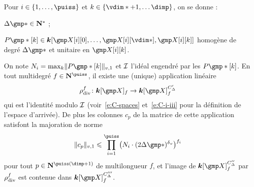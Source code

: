 \begin{lem}
  Pour \( \fct \in \{ 1, \dots, \puiss \} \) et \( \ind \in \{ \vdim* + 1,
  \dots \dimp \} \), on se donne :
  \begin{enumthm}
    \item \( \Delta\mexp* \in \N^* \) ;
    \item \( P\mexp*[\ind]
      \in
      \cdn [ \cmh\fct[0], \dots, \cmh\fct[\vdim*], \cmh\fct[\ind] ] \)
      homogène de degré \( \Delta\mexp* \) et unitaire en \( \cmh\fct[\ind]
      \).
  \end{enumthm}
  On note \( N_\fct = \max_\ind \nv1 { P\mexp*[\ind] } \) et \( \mathcal I \)
  l'idéal engendré par les \( P\mexp*[\ind] \). En tout multidegré
  \( f \in \N^\puiss \), il existe une (unique) application linéaire
  \begin{equation}
    \rdiv^f \colon \cdn [\cmmh]_ f \to \cdn [\cmmh]_ f^{C'_\Delta}
  \end{equation}
  qui est l'identité modulo \( \mathcal I \) (voir~\eqref{e:C-spaces}
  et~\eqref{e:C-i-iii} pour la définition de l'espace d'arrivée). De plus les
  colonnes \( c_p \) de la matrice de cette application satisfont la majoration
  de norme
  \begin{equation}
    \nv1{c_p}
    \le
    \prod\fctrange \bigl(
    N_\fct \cdot (2 \Delta\mexp*)^\dv
    \bigr) ^{f_\fct}
  \end{equation}
  pour tout \( p \in \N^{\puiss(\dimp+1)} \) de multilongueur \( f \), et
  l'image de \( \cdn [\cmmh]_ f ^{C''_\Delta} \) par \( \rho\sb{\mathrm{div }}^f \) est
  contenue dans \( \cdn [\cmmh]_ f ^{C'''_\Delta} \).
\end{lem}

